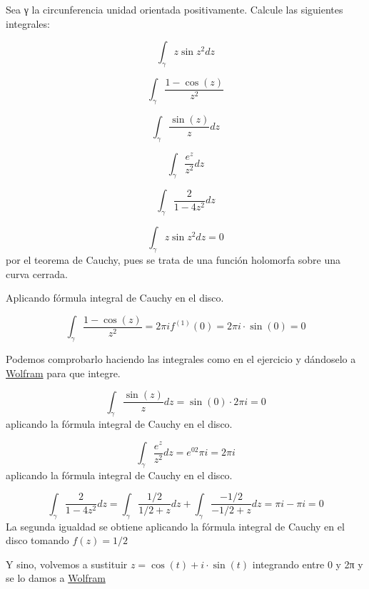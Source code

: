 \begin{problem}[12]
Sea γ la circunferencia unidad orientada positivamente. Calcule las siguientes integrales:

\ppart
\[\int_γ z \sin z^2 dz\]

\ppart
\[\int_γ \frac{1-\cos(z)}{z^2}\]

\ppart
\[\int_γ \frac{\sin(z)}{z} dz\]

\ppart
\[\int_γ \frac{e^z}{z^2}dz\]

\ppart
\[\int_γ \frac{2}{1-4z^2}dz\]
\solution

\spart
\[\int_γ z \sin z^2 dz = 0\]
por el teorema de Cauchy, pues se trata de una función holomorfa sobre una curva cerrada.

\spart
Aplicando fórmula integral de Cauchy en el disco.

\[\int_γ \frac{1-\cos(z)}{z^2} = 2πif^{(1)}(0)=2πi·\sin(0) = 0\]

Podemos comprobarlo haciendo las integrales como en el ejercicio y dándoselo a \href{http://www.wolframalpha.com/input/?t=crmtb01&f=ob&i=int%20(1-cos(cos(t)%20%2B%20i%20*%20sin(t)))%2F((cos(t)%20%2B%20i%20*%20sin(t))%5E2)%20(-cos(t)%20%2B%20i*sen(t))%20dt%20from%200%20to%202*pi}{Wolfram} para que integre.

\spart
\[\int_γ \frac{\sin(z)}{z} dz = \sin(0)\cdot 2πi = 0\]
aplicando la fórmula integral de Cauchy en el disco.

\spart
\[\int_γ \frac{e^z}{z^2}dz = e^02πi=2πi\]
aplicando la fórmula integral de Cauchy en el disco.

\spart


\[\int_γ \frac{2}{1-4z^2}dz = \int_γ \frac{1/2}{1/2+z}dz+\int_γ \frac{-1/2}{-1/2+z}dz = πi-πi=0\]
La segunda igualdad se obtiene aplicando la fórmula integral de Cauchy en el disco tomando $f(z)=1/2$

Y sino, volvemos a sustituir $z=\cos(t)+i·\sin(t)$ integrando entre 0 y 2π y se lo damos a \href{http://www.wolframalpha.com/input/?i=int+%281%2F4*%28cos%28t%29+%2B+i+*+sin%28t%29%29%5E2+%28-cos%28t%29+%2B+i*sen%28t%29%29+dt+from+0+to+2*pi}{Wolfram}

\end{problem}

